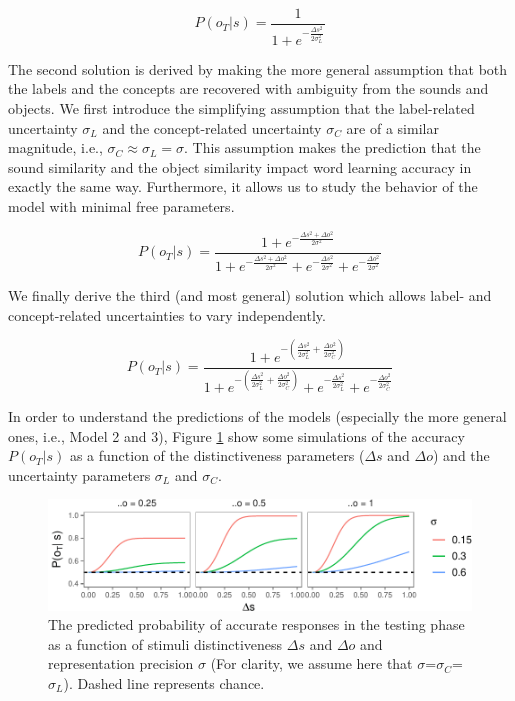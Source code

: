 \documentclass[english,,man,floatsintext]{apa6}
\theoremstyle{definition}
\theoremstyle{definition}
\theoremstyle{definition}
\theoremstyle{remark}
\begin{document}
\begin{equation}
P(o_T|s)= \frac{1}{1 + e^{-\frac{\Delta s^2}{2\sigma_L^2}}}
\end{equation}

The second solution is derived by making the more general assumption
that both the labels and the concepts are recovered with ambiguity from
the sounds and objects. We first introduce the simplifying assumption
that the label-related uncertainty \(\sigma_L\) and the concept-related
uncertainty \(\sigma_C\) are of a similar magnitude, i.e.,
\(\sigma_C \approx \sigma_L = \sigma\). This assumption makes the
prediction that the sound similarity and the object similarity impact
word learning accuracy in exactly the same way. Furthermore, it allows
us to study the behavior of the model with minimal free parameters.

\begin{equation}
P(o_T|s)= \frac{1 + e^{- \frac{\Delta s^2 + \Delta o^2}{2\sigma^2}}}{1 + e^{-\frac{\Delta s^2 + \Delta o^2}{2\sigma^2}}+ e^{-\frac{\Delta s^2}{2\sigma^2}} + e^{-\frac{\Delta o^2}{2\sigma^2}}}
\end{equation}

We finally derive the third (and most general) solution which allows
label- and concept-related uncertainties to vary independently.

\begin{equation}
P(o_T|s)= \frac{1 + e^{- (\frac{\Delta s^2}{2\sigma_L^2}+ \frac{\Delta o^2}{2\sigma_C^2})}}{1 + e^{-(\frac{\Delta s^2}{2\sigma_L^2}+ \frac{\Delta o^2}{2\sigma_C^2})}+ e^{-\frac{\Delta s^2}{2\sigma_L^2}} + e^{-\frac{\Delta o^2}{2\sigma_C^2}}}
\end{equation}

In order to understand the predictions of the models (especially the
more general ones, i.e., Model 2 and 3), Figure \ref{fig:simulation}
show some simulations of the accuracy \(P(o_T|s)\) as a function of the
distinctiveness parameters (\(\Delta s\) and \(\Delta o\)) and the
uncertainty parameters \(\sigma_L\) and \(\sigma_C\).

\begin{figure}[htbp]
\centering
\includegraphics{ms_files/figure-latex/simulation-1.pdf}
\caption{\label{fig:simulation}The predicted probability of accurate
responses in the testing phase as a function of stimuli distinctiveness
\(\Delta s\) and \(\Delta o\) and representation precision \(\sigma\)
(For clarity, we assume here that \(\sigma\)=\(\sigma_C\)=\(\sigma_L\)).
Dashed line represents chance.}
\end{figure}
\end{document}
